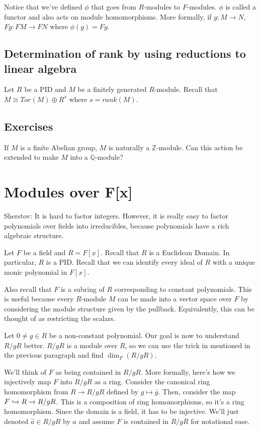 \documentclass{article}
\theoremstyle{definition}
\newcommand{\Z}{\mathbb{Z}}
\newcommand{\Q}{\mathbb{Q}}
\begin{document}
Notice that we've defined $\phi$ that goes from $R$-modules to $F$-modules. $\phi$ is called a functor and also acts on module homomorphisms. More formally, if $g: M \xrightarrow{} N$, $Fg: FM \xrightarrow{} FN$ where $\phi(g) = Fg$.

\subsection{Determination of rank by using reductions to linear algebra}

Let $R$ be a PID and $M$ be a finitely generated $R$-module. Recall that $M \cong Tor(M) \oplus R^{s}$ where $s = rank(M)$. 

\subsection{Exercises}

If $M$ is a finite Abelian group, $M$ is naturally a $\Z$-module. Can this action
be extended to make $M$ into a $\Q$-module?



\newpage

\section{Modules over F[x]}

Sherstov: It is hard to factor integers. However, it is really easy to factor polynomials over fields into irreducibles, because polynomials have a rich algebraic structure.

Let $F$ be a field and $R = F[x]$. Recall that $R$ is a Euclidean Domain. In particular, $R$ is a PID. Recall that we can identify every ideal of $R$ with a unique monic polynomial in $F[x]$.

Also recall that $F$ is a subring of $R$ corresponding to constant polynomials. This is useful because every $R$-module $M$ can be made into a vector space over $F$ by considering the module structure given by the pullback. Equivalently, this can be thought of as restricting the scalars.

Let $0 \neq g \in R$ be a non-constant polynomial. Our goal is now to understand $R/gR$ better. $R/gR$ is a module over $R$, so we can use the trick in mentioned in the previous paragraph and find $\dim_{F}(R/gR)$.

We'll think of $F$ as being contained in $R/gR$. More formally, here's how we injectively map $F$ into $R/gR$ as a ring. Consider the canonical ring homomorphism from $R \xrightarrow{} R/gR$ defined by $g \mapsto \bar{g}$. Then, consider the map $F \xhookrightarrow{} R \xrightarrow{} R/gR$. This is a composition of ring homomorphisms, so it's a ring homomorphism. Since the domain is a field, it has to be injective. We'll just denoted $\hat{a} \in R/gR$ by $a$ and assume $F$ is contained in $R/gR$ for notational ease.
\end{document}
